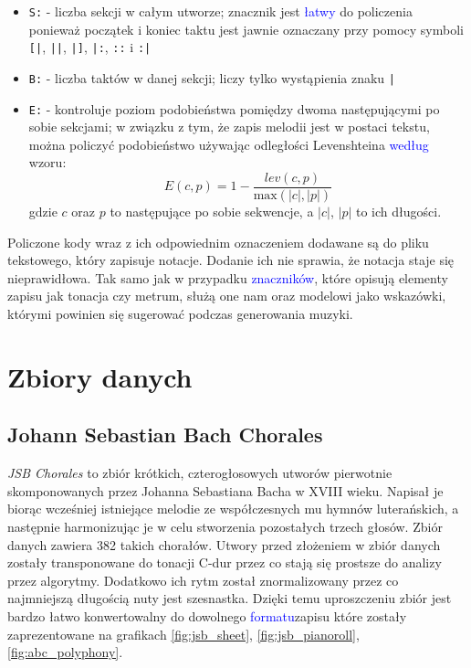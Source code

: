 \documentclass[data-science]{agh-wi} %
\begin{document}
\begin{itemize}
    \item \texttt{S:} - liczba sekcji w całym utworze; znacznik jest \textcolor{blue}{łatwy} do policzenia ponieważ początek i koniec taktu jest jawnie oznaczany przy pomocy symboli \texttt{[|}, \texttt{||}, \texttt{|]}, \texttt{|:}, \texttt{::} i \texttt{:|}
    \item \texttt{B:} - liczba taktów w danej sekcji; liczy tylko wystąpienia znaku \texttt{|}
    \item \texttt{E:} - kontroluje poziom podobieństwa pomiędzy dwoma następującymi po sobie sekcjami; w związku z tym, że zapis melodii jest w postaci tekstu, można policzyć podobieństwo używając odległości Levenshteina \textcolor{blue}{według} wzoru:
          \begin{equation}
              E(c,p) = 1 - \dfrac{lev(c, p)}{\text{max}(|c|, |p|)}
          \end{equation}
          gdzie $c$ oraz $p$ to następujące po sobie sekwencje, a $|c|$, $|p|$ to ich długości.
\end{itemize}

Policzone kody wraz z ich odpowiednim oznaczeniem dodawane są do pliku tekstowego, który zapisuje notacje. Dodanie ich nie sprawia, że notacja staje się nieprawidłowa. Tak samo jak w przypadku \textcolor{blue}{znaczników}, które opisują elementy zapisu jak tonacja czy metrum, służą one nam oraz modelowi jako wskazówki, którymi powinien się sugerować podczas generowania muzyki.

\section{Zbiory danych}

\subsection{Johann Sebastian Bach Chorales}
\textit{JSB Chorales} \cite{bachchorales} to zbiór krótkich, czterogłosowych utworów pierwotnie skomponowanych przez Johanna Sebastiana Bacha w XVIII wieku. Napisał je biorąc wcześniej istniejące melodie ze współczesnych mu hymnów luterańskich, a następnie harmonizując je w celu stworzenia pozostałych trzech głosów. Zbiór danych zawiera 382 takich chorałów. Utwory przed złożeniem w zbiór danych zostały transponowane do tonacji C-dur przez co stają się prostsze do analizy przez algorytmy. Dodatkowo ich rytm został znormalizowany przez co najmniejszą długością nuty jest szesnastka. Dzięki temu uproszczeniu zbiór jest bardzo łatwo konwertowalny do dowolnego \textcolor{blue}{formatu}zapisu które zostały zaprezentowane na grafikach \ref*{fig:jsb_sheet}, \ref*{fig:jsb_pianoroll}, \ref*{fig:abc_polyphony}.
\end{document}
